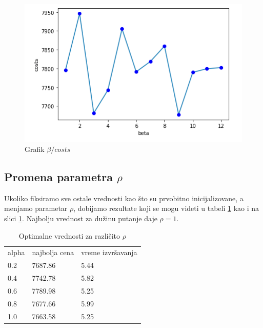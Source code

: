 \documentclass[a4paper]{article}
\begin{document}
\begin{figure}[h!]
\begin{center}
\includegraphics[scale=0.7]{beta.png}
\end{center}
\caption{Grafik $\beta / costs$}
\label{fig:beta}
\end{figure}


\clearpage
\subsection{Promena parametra $\rho$}

Ukoliko fiksiramo sve ostale vrednosti kao što su prvobitno inicijalizovane, a menjamo parametar $\rho$, dobijamo rezultate koji se mogu videti u tabeli \ref{tab:rho} kao i na slici \ref{tab:rho}.
Najbolju vrednost za dužinu putanje daje $\rho = 1$.

\hfill \break

\begin{table}[h]
\begin{center}
\begin{tabular}{ |p{2cm}|p{2cm}|p{2cm}|  }
\hline
\rowcolor{lightgray} \multicolumn{3}{|c|}{Promena parametra $\rho$} \\
\hline
alpha & najbolja cena & vreme izvršavanja \\
\hline
0.2 & 7687.86 & 5.44 \\
0.4 & 7742.78 & 5.82 \\
0.6 & 7789.98 & 5.25  \\
0.8 & 7677.66 & 5.99 \\
\rowcolor{cyan}
1.0 & 7663.58 & 5.25 \\
\hline
\end{tabular}
\end{center}
\caption {Optimalne vrednosti za različito $\rho$ \label{tab:rho}}
\end{table}
\end{document}
